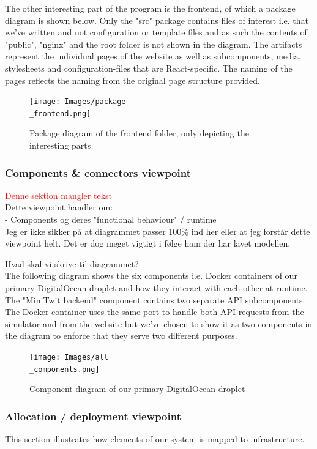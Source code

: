 \newpage
The other interesting part of the program is the frontend, of which a package diagram is shown below.
Only the "src" package contains files of interest i.e. that we've written and not configuration or template files and as such the contents of "public", "nginx" and the root folder is not shown in the diagram. The artifacts represent the individual pages of the website as well as subcomponents, media, stylesheets and configuration-files that are React-specific. The naming of the pages reflects the naming from the original page structure provided.

\begin{figure}[H]
 \centering
 \texttt{[image: Images/package\\\_frontend.png]}
 \caption{Package diagram of the frontend folder, only depicting the interesting parts}
 \label{fig:FrontendPackageDiagram}
\end{figure}


\subsubsection{Components \& connectors viewpoint}
\textcolor{red}{Denne sektion mangler tekst}\\
Dette viewpoint handler om: \\
- Components og deres "functional behaviour" / runtime \\
Jeg er ikke sikker på at diagrammet passer 100\% ind her eller at jeg forstår dette viewpoint helt. Det er dog meget vigtigt i følge ham der har lavet modellen. 


Hvad skal vi skrive til diagrammet? \\


The following diagram shows the six components i.e. Docker containers of our primary DigitalOcean droplet and how they interact with each other at runtime. The "MiniTwit backend" component contains two separate API subcomponents. The Docker container uses the same port to handle both API requests from the simulator and from the website but we've chosen to show it as two components in the diagram to enforce that they serve two different purposes.
\begin{figure}[H]
 \centering
 \texttt{[image: Images/all\\\_components.png]}
 \caption{Component diagram of our primary DigitalOcean droplet}
 \label{fig:CompleteComponentDiagram}
\end{figure}


\subsubsection{Allocation / deployment viewpoint}
This section illustrates how elements of our system is mapped to infrastructure.


